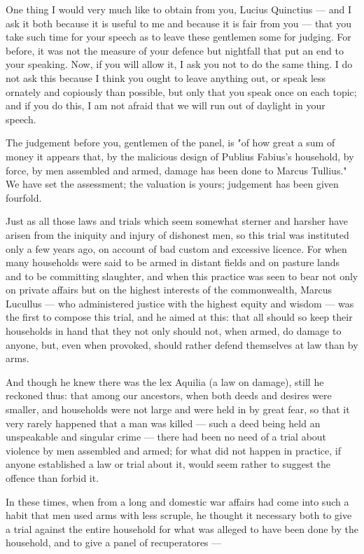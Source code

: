 One thing I would very much like to obtain from you, Lucius Quinctius --- and I ask it both because it is useful to me and because it is fair from you --- that you take such time for your speech as to leave these gentlemen some for judging. For before, it was not the measure of your defence but nightfall that put an end to your speaking. Now, if you will allow it, I ask you not to do the same thing. I do not ask this because I think you ought to leave anything out, or speak less ornately and copiously than possible, but only that you speak once on each topic; and if you do this, I am not afraid that we will run out of daylight in your speech.

 The judgement before you, gentlemen of the panel, is "of how great a sum of money it appears that, by the malicious design of Publius Fabius's household, by force, by men assembled and armed, damage has been done to Marcus Tullius." We have set the assessment; the valuation is yours; judgement has been given fourfold.

 Just as all those laws and trials which seem somewhat sterner and harsher have arisen from the iniquity and injury of dishonest men, so this trial was instituted only a few years ago, on account of bad custom and excessive licence. For when many households were said to be armed in distant fields and on pasture lands and to be committing slaughter, and when this practice was seen to bear not only on private affairs but on the highest interests of the commonwealth, Marcus Lucullus --- who administered justice with the highest equity and wisdom --- was the first to compose this trial, and he aimed at this: that all should so keep their households in hand that they not only should not, when armed, do damage to anyone, but, even when provoked, should rather defend themselves at law than by arms.

 And though he knew there was the lex Aquilia (a law on damage), still he reckoned thus: that among our ancestors, when both deeds and desires were smaller, and households were not large and were held in by great fear, so that it very rarely happened that a man was killed --- such a deed being held an unspeakable and singular crime --- there had been no need of a trial about violence by men assembled and armed; for what did not happen in practice, if anyone established a law or trial about it, would seem rather to suggest the offence than forbid it.

 In these times, when from a long and domestic war affairs had come into such a habit that men used arms with less scruple, he thought it necessary both to give a trial against the entire household for what was alleged to have been done by the household, and to give a panel of recuperatores ---

